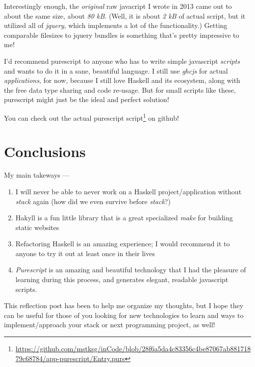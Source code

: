 \documentclass[]{article}
\renewcommand{\href}[2]{#2\footnote{\url{#1}}}
\begin{document}
Interestingly enough, the \emph{original} raw javacript I wrote in 2013
came out to about the same size, about \emph{80 kB}. (Well, it is about
\emph{2 kB} of actual script, but it utilized all of \emph{jquery},
which implements a lot of the functionality.) Getting comparable
filesizes to jquery bundles is something that's pretty impressive to me!

I'd recommend purescript to anyone who has to write simple javascript
\emph{scripts} and wants to do it in a sane, beautiful language. I still
use \emph{ghcjs} for actual \emph{applications}, for now, because I
still love Haskell and its ecosystem, along with the free data type
sharing and code re-usage. But for small scripts like these, purescript
might just be the ideal and perfect solution!

You can check out
\href{https://github.com/mstksg/inCode/blob/28f6a5da4c83356c4be87067ab88171879c68784/app-purescript/Entry.purs}{the
actual purescript script} on github!

\section{Conclusions}\label{conclusions}

My main takeways ---

\begin{enumerate}
\def\labelenumi{\arabic{enumi}.}
\tightlist
\item
  I will never be able to never work on a Haskell project/application
  without \emph{stack} again (how did we even survive before
  \emph{stack}?)
\item
  Hakyll is a fun little library that is a great specialized \emph{make}
  for building static websites
\item
  Refactoring Haskell is an amazing experience; I would recommend it to
  anyone to try it out at least once in their lives
\item
  \emph{Purescript} is an amazing and beautiful technology that I had
  the pleasure of learning during this process, and generates elegant,
  readable javascript scripts.
\end{enumerate}

This reflection post has been to help me organize my thoughts, but I
hope they can be useful for those of you looking for new technologies to
learn and ways to implement/approach your stack or next programming
project, as well!
\end{document}
